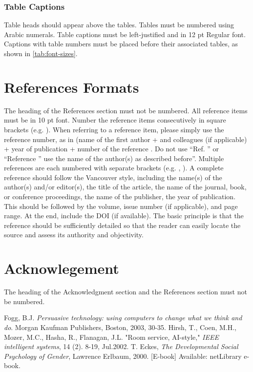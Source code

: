 \documentclass[12pt, twocolumn, a4paper]{article}
\begin{document}
\subsubsection{Table Captions}
Table heads should appear above the tables. Tables must be numbered using Arabic numerals. Table captions must be left-justified and in 12 pt Regular font. Captions with table numbers must be placed before their associated tables, as shown in \autoref{tab:font-sizes}.

\section{References Formats}
The heading of the References section must not be numbered. All reference items must be in 10 pt font. Number the reference items consecutively in square brackets (e.g. \cite{exemplo}). When referring to a reference item, please simply use the reference number, as in (name of the first author + and colleagues (if applicable) + year of publication + number of the reference \cite{exemplo2}.  Do not use “Ref. \cite{exemplo3}” or “Reference \cite{exemplo3}” use the name of the author(s) as described before”.  Multiple references are each numbered with separate brackets (e.g. \cite{exemplo}, \cite{exemplo2,exemplo3}).
A complete reference should follow the Vancouver style, including the name(s) of the author(s) and/or editor(s), the title of the article, the name of the journal, book, or conference proceedings, the name of the publisher, the year of publication. This should be followed by the volume, issue number (if applicable), and page range. At the end, include the DOI (if available).
The basic principle is that the reference should be sufficiently detailed so that the reader can easily locate the source and assess its authority and objectivity.


\section*{Acknowlegement}
The heading of the Acknowledgment section and the References section must not be numbered.



\begin{thebibliography}{99}
\fontsize{10}{12}\selectfont
\setlength{\parskip}{0pt}
\setlength{\itemsep}{0pt}
 Fogg, B.J. \textit{Persuasive technology: using computers to change what we think and do}. Morgan Kaufman Publishers, Boston, 2003, 30-35.
 Hirsh, T., Coen, M.H., Mozer, M.C., Hasha, R., Flanagan, J.L. "Room service, AI-style," \textit{IEEE intelligent systems}, 14 (2). 8-19, Jul.2002.
 T. Eckes, \textit{The Developmental Social Psychology of Gender}, Lawrence Erlbaum, 2000. [E-book] Available: netLibrary e-book.
\end{thebibliography}


\end{document}

